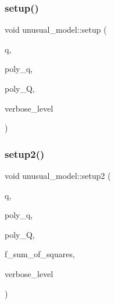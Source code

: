 \mbox{\label{classunusual__model_adb517fd342dd2ed2d0cc117211ac1c0d}} 
\subsubsection{\texorpdfstring{setup()}{setup()}}
{\footnotesize\ttfamily void unusual\+\_\+model\+::setup (\begin{DoxyParamCaption}\item[{\mbox{\hyperlink{galois_8h_a09fddde158a3a20bd2dcadb609de11dc}{I\+NT}}}]{q,  }\item[{const \mbox{\hyperlink{galois_8h_ab6cc7b4aeb6ea31aba2b3fbfc83ff5e6}{B\+Y\+TE}} $\ast$}]{poly\+\_\+q,  }\item[{const \mbox{\hyperlink{galois_8h_ab6cc7b4aeb6ea31aba2b3fbfc83ff5e6}{B\+Y\+TE}} $\ast$}]{poly\+\_\+Q,  }\item[{\mbox{\hyperlink{galois_8h_a09fddde158a3a20bd2dcadb609de11dc}{I\+NT}}}]{verbose\+\_\+level }\end{DoxyParamCaption})}

\mbox{\label{classunusual__model_a00f7da705c24f863338828447abf7aae}} 
\subsubsection{\texorpdfstring{setup2()}{setup2()}}
{\footnotesize\ttfamily void unusual\+\_\+model\+::setup2 (\begin{DoxyParamCaption}\item[{\mbox{\hyperlink{galois_8h_a09fddde158a3a20bd2dcadb609de11dc}{I\+NT}}}]{q,  }\item[{const \mbox{\hyperlink{galois_8h_ab6cc7b4aeb6ea31aba2b3fbfc83ff5e6}{B\+Y\+TE}} $\ast$}]{poly\+\_\+q,  }\item[{const \mbox{\hyperlink{galois_8h_ab6cc7b4aeb6ea31aba2b3fbfc83ff5e6}{B\+Y\+TE}} $\ast$}]{poly\+\_\+Q,  }\item[{\mbox{\hyperlink{galois_8h_a09fddde158a3a20bd2dcadb609de11dc}{I\+NT}}}]{f\+\_\+sum\+\_\+of\+\_\+squares,  }\item[{\mbox{\hyperlink{galois_8h_a09fddde158a3a20bd2dcadb609de11dc}{I\+NT}}}]{verbose\+\_\+level }\end{DoxyParamCaption})}

